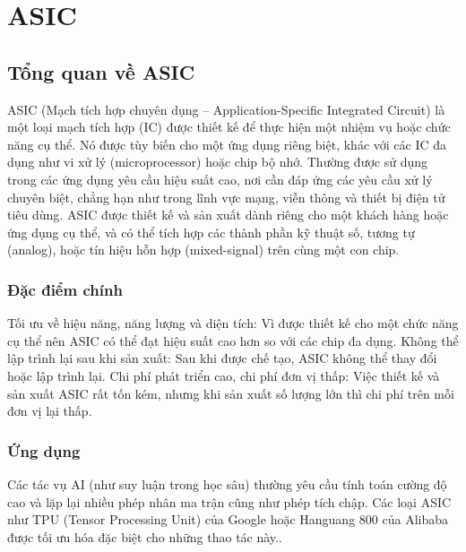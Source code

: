 \documentclass[a4paper]{article}
\begin{document}
\section{ASIC}
\subsection{Tổng quan về ASIC}
ASIC (Mạch tích hợp chuyên dụng – Application-Specific Integrated Circuit) là một loại mạch tích hợp (IC) được thiết kế để thực hiện một nhiệm vụ hoặc chức năng cụ thể. Nó được tùy biến cho một ứng dụng riêng biệt, khác với các IC đa dụng như vi xử lý (microprocessor) hoặc chip bộ nhớ.
Thường được sử dụng trong các ứng dụng yêu cầu hiệu suất cao, nơi cần đáp ứng các yêu cầu xử lý chuyên biệt, chẳng hạn như trong lĩnh vực mạng, viễn thông và thiết bị điện tử tiêu dùng. ASIC được thiết kế và sản xuất dành riêng cho một khách hàng hoặc ứng dụng cụ thể, và có thể tích hợp các thành phần kỹ thuật số, tương tự (analog), hoặc tín hiệu hỗn hợp (mixed-signal) trên cùng một con chip.
\subsubsection{Đặc điểm chính}
Tối ưu về hiệu năng, năng lượng và diện tích: Vì được thiết kế cho một chức năng cụ thể nên ASIC có thể đạt hiệu suất cao hơn so với các chip đa dụng.
Không thể lập trình lại sau khi sản xuất: Sau khi được chế tạo, ASIC không thể thay đổi hoặc lập trình lại.
Chi phí phát triển cao, chi phí đơn vị thấp: Việc thiết kế và sản xuất ASIC rất tốn kém, nhưng khi sản xuất số lượng lớn thì chi phí trên mỗi đơn vị lại thấp.
\subsubsection{Ứng dụng}
Các tác vụ AI (như suy luận trong học sâu) thường yêu cầu tính toán cường độ cao và lặp lại nhiều phép nhân ma trận cũng như phép tích chập.
Các loại ASIC như TPU (Tensor Processing Unit) của Google hoặc Hanguang 800 của Alibaba được tối ưu hóa đặc biệt cho những thao tác này..
\end{document}
